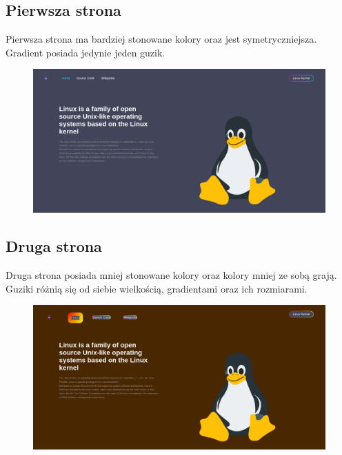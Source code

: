 \documentclass{article}
\begin{document}
\subsection{Pierwsza strona}
Pierwsza strona ma bardziej stonowane kolory oraz jest symetryczniejsza. Gradient posiada jedynie jeden guzik.
\begin{figure}[h!]
    \includegraphics[scale=0.25]{str_dark.png}
    \centering
\end{figure}


\subsection{Druga strona}
Druga strona posiada mniej stonowane kolory oraz kolory mniej ze sobą grają. Guziki różnią się od siebie wielkością, gradientami oraz ich rozmiarami.

\begin{figure}[h!]
    \includegraphics[scale=0.25]{str_pom.png}
    \centering
\end{figure}
\end{document}
